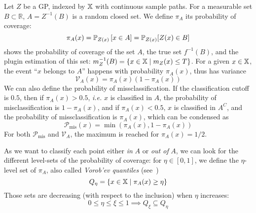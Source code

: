 \documentclass[../../Main_ManuscritThese.tex]{subfiles}
\begin{document}
Let $Z$ be a GP, indexed by $\mathbb{X}$ with continuous sample paths. For a measurable set $B\subset \mathbb{R}$, $A = Z^{-1}(B)$ is a random closed set.
We define $\pi_A$ its probability of coverage:
\begin{equation}
  \pi_A(x) = \mathbb{P}_{Z(x)}\left[x\in A\right] = \mathbb{P}_{Z(x)}[Z(x) \in B]
\end{equation}
 shows the probability of coverage of the set $A$, the true set $f^{-1}(B)$, and the plugin estimation of this set: $m_Z^{-1}(B) = \{x\in\mathbb{X} \mid m_Z(x) \leq T\}$.
For a given $x\in\mathbb{X}$, the event ``$x$ belongs to $A$'' happens with probability $\pi_A(x)$, thus has variance %
\begin{equation}
\mathscr{V}_A(x)=\pi_A(x)(1 - \pi_A(x))
\end{equation}
We can also define the probability of missclassification. If the classification cutoff is $0.5$, then if $\pi_A(x) > 0.5$, \emph{i.e.} $x$ is classified in $A$, the probability of misclassification is $1-\pi_A(x)$, and if $\pi_A(x) < 0.5$, $x$ is classified in $A^{C}$, and the probability of missclassification is $\pi_A(x)$, which can be condensed as
\begin{equation}
\mathscr{P}_{\mathrm{mis}}(x) = \min(\pi_A(x), 1-\pi_A(x))
\end{equation}
For both $\mathscr{P}_{\mathrm{mis}}$ and $\mathscr{V}_A$, the maximum is reached for $\pi_A(x) = 1/2$.

As we want to classify each point either \emph{in} $A$ or \emph{out of} $A$, we can look for the different level-sets of the probability of coverage: for $\eta \in [0, 1]$, we define the $\eta$-level set of $\pi_A$, also called \emph{Vorob'ev quantiles} (see~\cite{vorobyev_new_2003})
\begin{equation}
  Q_{\eta} = \{x\in\mathbb{X} \mid \pi_A(x) \geq \eta \}
\end{equation}
Those sets are decreasing (with respect to the inclusion) when $\eta$ increases:
\begin{equation}
  0\leq \eta \leq \xi \leq 1 \implies Q_{\xi} \subseteq Q_{\eta}
\end{equation}
\end{document}
